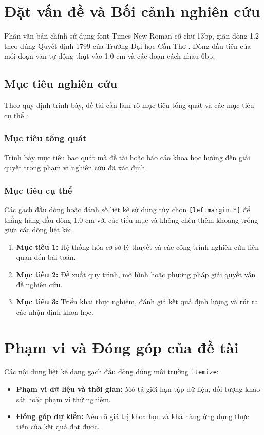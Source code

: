 
\section{Đặt vấn đề và Bối cảnh nghiên cứu}\label{sec:ch01_dat_van_de}

Phần văn bản chính sử dụng font Times New Roman cỡ chữ 13bp, giãn dòng 1.2 theo đúng Quyết định 1799 của Trường Đại học Cần Thơ \cite{ctu_qd1799}. Dòng đầu tiên của mỗi đoạn văn tự động thụt vào 1.0 cm và các đoạn cách nhau 6bp.

\subsection{Mục tiêu nghiên cứu}

Theo quy định trình bày, đề tài cần làm rõ mục tiêu tổng quát và các mục tiêu cụ thể \cite{sample_article2024}:

\subsubsection{Mục tiêu tổng quát}

Trình bày mục tiêu bao quát mà đề tài hoặc báo cáo khoa học hướng đến giải quyết trong phạm vi nghiên cứu đã xác định.

\subsubsection{Mục tiêu cụ thể}

Các gạch đầu dòng hoặc đánh số liệt kê sử dụng tùy chọn \texttt{[leftmargin=*]} để thẳng hàng đầu dòng 1.0 cm với các tiểu mục và không chèn thêm khoảng trống giữa các dòng liệt kê:
\begin{enumerate}[leftmargin=*]
  \item \textbf{Mục tiêu 1:} Hệ thống hóa cơ sở lý thuyết và các công trình nghiên cứu liên quan đến bài toán.
  \item \textbf{Mục tiêu 2:} Đề xuất quy trình, mô hình hoặc phương pháp giải quyết vấn đề nghiên cứu.
  \item \textbf{Mục tiêu 3:} Triển khai thực nghiệm, đánh giá kết quả định lượng và rút ra các nhận định khoa học.
\end{enumerate}

\section{Phạm vi và Đóng góp của đề tài}\label{sec:ch01_pham_vi}

Các nội dung liệt kê dạng gạch đầu dòng dùng môi trường \texttt{itemize}:
\begin{itemize}[leftmargin=*]
  \item \textbf{Phạm vi dữ liệu và thời gian:} Mô tả giới hạn tập dữ liệu, đối tượng khảo sát hoặc phạm vi thử nghiệm.
  \item \textbf{Đóng góp dự kiến:} Nêu rõ giá trị khoa học và khả năng ứng dụng thực tiễn của kết quả đạt được.
\end{itemize}
